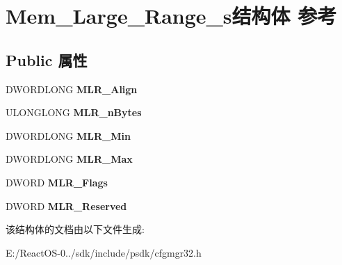 \hypertarget{struct_mem___large___range__s}{}\section{Mem\+\_\+\+Large\+\_\+\+Range\+\_\+s结构体 参考}
\label{struct_mem___large___range__s}
\subsection*{Public 属性}
\begin{DoxyCompactItemize}
\item 
\mbox{\label{struct_mem___large___range__s_ae8d58a5e44004ed532337425ee36d44d}} 
D\+W\+O\+R\+D\+L\+O\+NG {\bfseries M\+L\+R\+\_\+\+Align}
\item 
\mbox{\label{struct_mem___large___range__s_ab3fa885acf2a0f83aca4a33906e18e30}} 
U\+L\+O\+N\+G\+L\+O\+NG {\bfseries M\+L\+R\+\_\+n\+Bytes}
\item 
\mbox{\label{struct_mem___large___range__s_adeb773e21f2f430f37d0e622ffc7fefb}} 
D\+W\+O\+R\+D\+L\+O\+NG {\bfseries M\+L\+R\+\_\+\+Min}
\item 
\mbox{\label{struct_mem___large___range__s_a4a6ae0351c3fe80a232721a6770e1a23}} 
D\+W\+O\+R\+D\+L\+O\+NG {\bfseries M\+L\+R\+\_\+\+Max}
\item 
\mbox{\label{struct_mem___large___range__s_a5136330f8e7b66bbf89c365a20e5020a}} 
D\+W\+O\+RD {\bfseries M\+L\+R\+\_\+\+Flags}
\item 
\mbox{\label{struct_mem___large___range__s_a5f83a83ef2f9491272f01dbd8dbe2851}} 
D\+W\+O\+RD {\bfseries M\+L\+R\+\_\+\+Reserved}
\end{DoxyCompactItemize}


该结构体的文档由以下文件生成\+:\begin{DoxyCompactItemize}
\item 
E\+:/\+React\+O\+S-\/0../sdk/include/psdk/cfgmgr32.\+h\end{DoxyCompactItemize}
